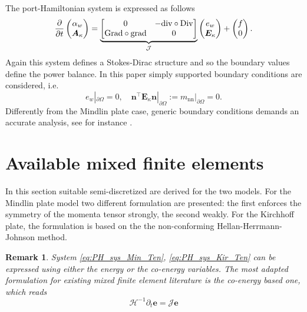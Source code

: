\documentclass{ifacconf}
\newtheorem{remark}{Remark}
\begin{document}
The port-Hamiltonian system is expressed as follows 
\begin{equation}
\label{eq:PH_sys_Kir_Ten}
\diffp{}{t}
\begin{pmatrix}
\alpha_w \\
\bm{A}_\kappa \\
\end{pmatrix} = 
\underbrace{\begin{bmatrix}
	0  & -\mathrm{div} \circ \mathrm{Div} \\
	\mathrm{Grad} \circ \mathrm{grad}  & 0 \\
	\end{bmatrix}}_{\mathcal{J}}
\begin{pmatrix}
e_w \\
\bm{E}_{\kappa} \\
\end{pmatrix}+ 
\begin{pmatrix}
f \\
0 \\
\end{pmatrix}.
\end{equation}
Again this system defines a Stokes-Dirac structure and so the boundary values define the power balance. In this paper simply supported boundary conditions are considered, i.e.
\[
e_w|_{\partial \Omega} = 0, \quad \bm{n}^\top \bm{E}_\kappa \bm{n}|_{\partial \Omega}:= m_{\text{nn}}|_{\partial \Omega} = 0.
\]
Differently from the Mindlin plate case, generic boundary conditions demands an accurate analysis, see for instance \cite{Blum1990,mixed_kirchhoff}.

\section{Available mixed finite elements}

In this section suitable semi-discretized are derived for the two models. For the Mindlin plate model two different formulation are presented: the first enforces the symmetry of the momenta tensor strongly, the second weakly. For the Kirchhoff plate, the formulation is based on the the non-conforming Hellan-Herrmann-Johnson method. 

\begin{remark}
System \eqref{eq:PH_sys_Min_Ten}, \eqref{eq:PH_sys_Kir_Ten} can be expressed using either the energy or the co-energy variables. The  most adapted formulation for existing mixed finite element literature is the co-energy based one, which reads
\[
\mathcal{H}^{-1} \partial_t \bm{e} = \mathcal{J} \bm{e}
\]
\end{remark}
\end{document}
